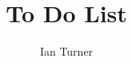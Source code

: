 \documentclass{article}
\title{To Do List }
\author{Ian Turner}
\begin{document}
\maketitle
\section*{ }
\end{document}
